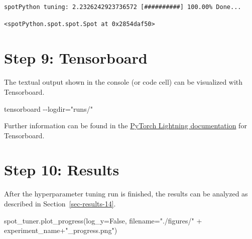 \documentclass[
  letterpaper,
  DIV=11,
  numbers=noendperiod]{scrreprt}
\newenvironment{Shaded}{\begin{snugshade}}{\end{snugshade}}
\newcommand{\NormalTok}[1]{\textcolor[rgb]{0.00,0.23,0.31}{#1}}
\newcommand{\OperatorTok}[1]{\textcolor[rgb]{0.37,0.37,0.37}{#1}}
\newcommand{\StringTok}[1]{\textcolor[rgb]{0.13,0.47,0.30}{#1}}
\newcommand{\VariableTok}[1]{\textcolor[rgb]{0.07,0.07,0.07}{#1}}
\begin{document}
\begin{verbatim}
spotPython tuning: 2.2326242923736572 [##########] 100.00% Done...
\end{verbatim}

\begin{verbatim}
<spotPython.spot.spot.Spot at 0x2854daf50>
\end{verbatim}

\hypertarget{sec-tensorboard-31}{%
\section{Step 9: Tensorboard}\label{sec-tensorboard-31}}

The textual output shown in the console (or code cell) can be visualized
with Tensorboard.

\begin{Shaded}
\begin{Highlighting}[]
\NormalTok{tensorboard {-}{-}logdir="runs/"}
\end{Highlighting}
\end{Shaded}

Further information can be found in the
\href{https://lightning.ai/docs/pytorch/stable/api/lightning.pytorch.loggers.tensorboard.html}{PyTorch
Lightning documentation} for Tensorboard.

\hypertarget{sec-results-31}{%
\section{Step 10: Results}\label{sec-results-31}}

After the hyperparameter tuning run is finished, the results can be
analyzed as described in Section~\ref{sec-results-14}.

\begin{Shaded}
\begin{Highlighting}[]
\NormalTok{spot\_tuner.plot\_progress(log\_y}\OperatorTok{=}\VariableTok{False}\NormalTok{,}
\NormalTok{    filename}\OperatorTok{=}\StringTok{"./figures/"} \OperatorTok{+}\NormalTok{ experiment\_name}\OperatorTok{+}\StringTok{"\_progress.png"}\NormalTok{)}
\end{Highlighting}
\end{Shaded}
\end{document}
